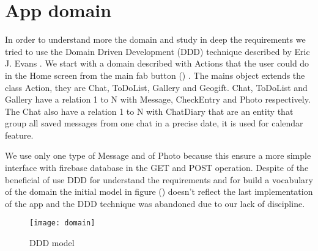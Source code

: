 
\section{App domain}
\label{sec:app-domain}

In order to understand more the domain and study in deep the requirements we tried to use the Domain Driven Development (DDD) technique described by Eric J. Evans \cite{DDD_Eric}. We start with a domain described with Actions that the user could do in the Home screen from the main fab button () .
The mains object extends the class Action, they are Chat, ToDoList, Gallery and Geogift. Chat, ToDoList and Gallery have a relation 1 to N with Message, CheckEntry and Photo respectively. The Chat also have a relation 1 to N with ChatDiary that are an entity that group all saved messages from one chat in a precise date, it is used for calendar feature. 

We use only one type of Message and of Photo because this ensure a more simple interface with firebase database in the GET and POST operation. Despite of the beneficial of use DDD for understand the requirements and for build a vocabulary of the domain the initial model in figure () doesn't reflect the last implementation of the app and the DDD technique was abandoned due to our lack of discipline.

\begin{figure}[hb]
	\texttt{[image: domain]}
	\caption{DDD model}
	\label{fig:DDD_model}
\end{figure}